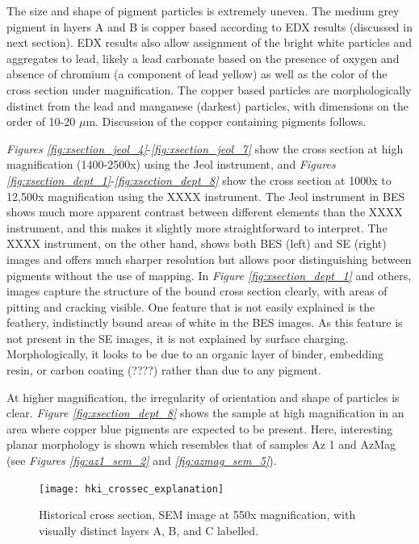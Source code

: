 The size and shape of pigment particles is extremely uneven. The medium grey pigment in layers A and B is copper based according to EDX results (discussed in next section). EDX results also allow assignment of the bright white particles and aggregates to lead, likely a lead carbonate based on the presence of oxygen and absence of chromium (a component of lead yellow) as well as the color of the cross section under magnification. The copper based particles are morphologically distinct from the lead and manganese (darkest) particles, with dimensions on the order of 10-20 $\mu$m. Discussion of the copper containing pigments follows.

\textit{Figures \ref{fig:xsection_jeol_4}}-\textit{\ref{fig:xsection_jeol_7}} show the cross section at high magnification (1400-2500x) using the Jeol instrument, and \textit{Figures \ref{fig:xsection_dept_1}}-\textit{\ref{fig:xsection_dept_8}} show the cross section at 1000x to 12,500x magnification using the XXXX instrument. The Jeol instrument in BES shows much more apparent contrast between different elements than the XXXX instrument, and this makes it slightly more straightforward to interpret. The XXXX instrument, on the other hand, shows both BES (left) and SE (right) images and offers much sharper resolution but allows poor distinguishing between pigments without the use of mapping. In \textit{Figure \ref{fig:xsection_dept_1}} and others, images capture the structure of the bound cross section clearly, with areas of pitting and cracking visible. One feature that is not easily explained is the feathery, indistinctly bound areas of white in the BES images. As this feature is not present in the SE images, it is not explained by surface charging. Morphologically, it looks to be due to an organic layer of binder, embedding resin, or carbon coating (????) rather than due to any pigment.

At higher magnification, the irregularity of orientation and shape of particles is clear. \textit{Figure \ref{fig:xsection_dept_8}} shows the sample at high magnification in an area where copper blue pigments are expected to be present. Here, interesting planar morphology is shown which resembles that of samples Az 1 and AzMag (see \textit{Figures \ref{fig:az1_sem_2}} and \textit{\ref{fig:azmag_sem_5}}).


\begin{figure}[H]
\centering
  \texttt{[image: hki\_crossec\_explanation]}
\caption[Historical cross section with visually distinct layers A, B, and C labelled]{Historical cross section, SEM image at 550x magnification, with visually distinct layers A, B, and C labelled.}
\label{fig:hki_crossec_explanation}
\end{figure}

